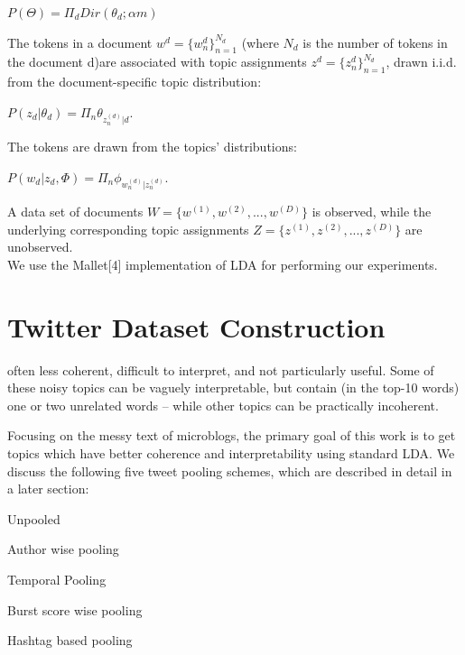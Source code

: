 \documentclass[10pt,a5paper,twoside]{article}
\begin{document}
\begin{center}
$P\left( \Theta \right)  = \Pi_{d}  Dir\left(  \theta_{d} ; \alpha m  \right) $
\end{center}

The tokens in a document $w^{d} = \lbrace w^{d}_{n} \rbrace^{N_{d}}_{n=1} $ (where $N_d$ is the number of tokens in the document d)are associated with topic assignments $z^{d} = \lbrace z^{d}_{n} \rbrace^{N_{d}}_{n=1} $, drawn i.i.d. from the document-specific topic distribution:
\begin{center}
$P\left( z_{d} | \theta_{d}  \right) = \Pi_{n} \theta_{ z^{\left( d\right) }_{n} | d}$.
\end{center}
The tokens are drawn from the topics’ distributions:
\begin{center}
$P\left( w_{d} | z_{d}, \Phi  \right) = \Pi_{n} \phi_{ w^{\left( d\right) }_{n} | z^{\left( d\right) }_{n}}$.
\end{center}

A data set of documents $W = \lbrace w^(1) , w^(2) , ..., w^(D) \rbrace $ is observed, while the underlying corresponding topic assignments $Z = \lbrace z^(1) , z^(2) , ..., z^(D) \rbrace $ are unobserved. 
\\

We use the Mallet[4] implementation of LDA for performing our experiments.


\section{Twitter Dataset Construction}

often less coherent, difficult to interpret, and not particularly useful. Some of these noisy topics can be vaguely interpretable, but contain (in the top-10 words) one or two unrelated words – while other topics can be practically incoherent. 

Focusing on the messy text of microblogs, the primary goal of this work is to get topics which have better coherence and interpretability using standard LDA. We discuss the following five tweet pooling schemes, which are described in detail in a later section:
\begin{compactitem}
\item Unpooled
\item Author wise pooling
\item Temporal Pooling
\item Burst score wise pooling
\item Hashtag based pooling
\end{compactitem}
\end{document}
